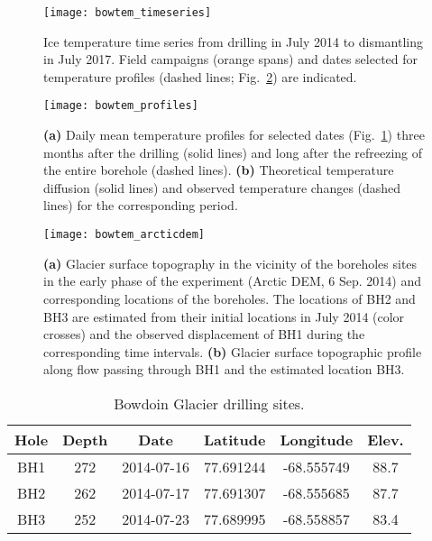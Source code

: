 \documentclass[utf8]{article}
\begin{document}
    \begin{figure}
      \centerline{\texttt{[image: bowtem\_timeseries]}}
      \caption{Ice temperature time series from drilling in July 2014 to
               dismantling in July 2017. Field campaigns (orange spans) and
               dates selected for temperature profiles (dashed lines;
               Fig.~\ref{fig:profiles}) are indicated.}
      \label{fig:timeseries}
    \end{figure}

    \begin{figure}
      \centerline{\texttt{[image: bowtem\_profiles]}}
      \caption{\textbf{(a)} Daily mean temperature profiles for selected dates
               (Fig.~\ref{fig:timeseries}) three months after the drilling
               (solid lines) and long after the refreezing of the entire
               borehole (dashed lines).
               \textbf{(b)} Theoretical temperature diffusion (solid lines) and
               observed temperature changes (dashed lines) for the
               corresponding period.}
      \label{fig:profiles}
    \end{figure}

    \begin{figure}
      \centerline{\texttt{[image: bowtem\_arcticdem]}}
      \caption{\textbf{(a)} Glacier surface topography in the vicinity of the
               boreholes sites in the early phase of the experiment (Arctic
               DEM, 6 Sep. 2014) and corresponding locations of the boreholes.
               The locations of BH2 and BH3 are estimated from their initial
               locations in July 2014 (color crosses) and the observed
               displacement of BH1 during the corresponding time intervals.
               \textbf{(b)} Glacier surface topographic profile along flow
               passing through BH1 and the estimated location BH3.}
      \label{fig:arcticdem}
    \end{figure}


\clearpage

    \begin{table}[t]
      \caption{%
        Bowdoin Glacier drilling sites.}
      \label{tab:drilling}
      {\begin{tabular}{cccccc}
        \hline
        Hole & Depth & Date       & Latitude  & Longitude  & Elev. \\
        \hline
        BH1  & 272   & 2014-07-16 & 77.691244 & -68.555749 & 88.7 \\ %
        BH2  & 262   & 2014-07-17 & 77.691307 & -68.555685 & 87.7 \\ %
        BH3  & 252   & 2014-07-23 & 77.689995 & -68.558857 & 83.4 \\ %
        \hline
      \end{tabular}}
    \end{table}
\end{document}
